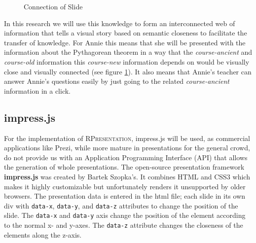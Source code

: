\documentclass[twoside, 12pt]{article}
\newcommand{\sys}{\textsc{RPresentation}\xspace}
\begin{document}
\begin{figure}
\vspace{-28pt}
  \begin{center}
  \end{center}
\vspace{-20pt}
  \caption{Connection of Slide}
  \label{fig:arrowspyg}
\vspace{-10pt}
\end{figure}

In this research we will use this knowledge to form an interconnected web of information that tells a visual story based on semantic closeness to facilitate the transfer of knowledge. For Annie this means that she will be presented with the information about the Pythagorean theorem in a way that the \textit{course-ancient} and \textit{course-old} information this \textit{course-new} information depends on would be visually close and visually connected (see figure \ref{fig:arrowspyg}). It also means that Annie's teacher can answer Annie's questions easily by just going to the related \textit{course-ancient} information in a click.\\

\subsection{impress.js}
\label{sec:Impressjs}

For the implementation of \sys, impress.js will be used, as commercial applications like Prezi, while more mature in presentations for the general crowd, do not provide us with an Application Programming Interface (API) that allows the generation of whole presentations. The open-source presentation framework \textbf{impress.js} \cite{JSImpress:npentrel14} was created by Bartek Szopka's. It combines HTML and CSS3 which makes it highly customizable but unfortunately renders it unsupported by older browsers. The presentation data is entered in the html file; each slide in its own div with \texttt{data-x}, \texttt{data-y}, and \texttt{data-z} attributes to change the position of the slide. The \texttt{data-x} and \texttt{data-y} axis change the position of the element according to the normal x- and y-axes. The \texttt{data-z} attribute changes the closeness of the elements along the z-axis.\\
\end{document}
